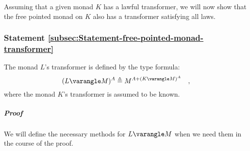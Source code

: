 Assuming that a given monad $K$ has a lawful transformer, we will
now show that the free pointed monad on $K$ also has a transformer
satisfying all laws.

\subsubsection{Statement \label{subsec:Statement-free-pointed-monad-transformer}\ref{subsec:Statement-free-pointed-monad-transformer}}

The monad $L$\textsf{'}s transformer is defined by the type formula:
\[
(L\varangle M)^{A}\triangleq M^{A+(K\varangle M)^{A}}\quad,
\]
where the monad $K$\textsf{'}s transformer is assumed to be known.

\subparagraph{Proof}

We will define the necessary methods for $L\varangle M$ when we need
them in the course of the proof.

